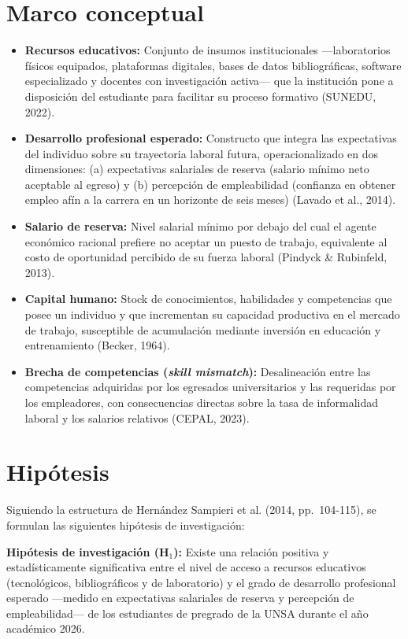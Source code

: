 \documentclass[11pt, a4paper]{article}
\begin{document}
\section{Marco conceptual}

\begin{itemize}
    \item \textbf{Recursos educativos:} Conjunto de insumos institucionales —laboratorios físicos equipados, plataformas digitales, bases de datos bibliográficas, software especializado y docentes con investigación activa— que la institución pone a disposición del estudiante para facilitar su proceso formativo (SUNEDU, 2022).
    \item \textbf{Desarrollo profesional esperado:} Constructo que integra las expectativas del individuo sobre su trayectoria laboral futura, operacionalizado en dos dimensiones: (a) expectativas salariales de reserva (salario mínimo neto aceptable al egreso) y (b) percepción de empleabilidad (confianza en obtener empleo afín a la carrera en un horizonte de seis meses) (Lavado et al., 2014).
    \item \textbf{Salario de reserva:} Nivel salarial mínimo por debajo del cual el agente económico racional prefiere no aceptar un puesto de trabajo, equivalente al costo de oportunidad percibido de su fuerza laboral (Pindyck \& Rubinfeld, 2013).
    \item \textbf{Capital humano:} Stock de conocimientos, habilidades y competencias que posee un individuo y que incrementan su capacidad productiva en el mercado de trabajo, susceptible de acumulación mediante inversión en educación y entrenamiento (Becker, 1964).
    \item \textbf{Brecha de competencias (\textit{skill mismatch}):} Desalineación entre las competencias adquiridas por los egresados universitarios y las requeridas por los empleadores, con consecuencias directas sobre la tasa de informalidad laboral y los salarios relativos (CEPAL, 2023).
\end{itemize}

\section{Hipótesis}

Siguiendo la estructura de Hernández Sampieri et al. (2014, pp.~104-115), se formulan las siguientes hipótesis de investigación:

\textbf{Hipótesis de investigación (H$_1$):} Existe una relación positiva y estadísticamente significativa entre el nivel de acceso a recursos educativos (tecnológicos, bibliográficos y de laboratorio) y el grado de desarrollo profesional esperado —medido en expectativas salariales de reserva y percepción de empleabilidad— de los estudiantes de pregrado de la UNSA durante el año académico 2026.
\end{document}

